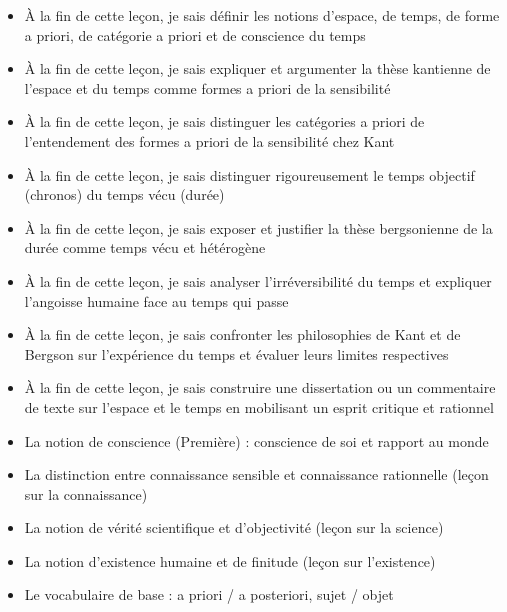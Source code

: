 \documentclass[11pt]{article}
\begin{document}
\begin{objectifs}
\begin{itemize}
\item À la fin de cette leçon, je sais définir les notions d'espace, de temps, de forme a priori, de catégorie a priori et de conscience du temps
\item À la fin de cette leçon, je sais expliquer et argumenter la thèse kantienne de l'espace et du temps comme formes a priori de la sensibilité
\item À la fin de cette leçon, je sais distinguer les catégories a priori de l'entendement des formes a priori de la sensibilité chez Kant
\item À la fin de cette leçon, je sais distinguer rigoureusement le temps objectif (chronos) du temps vécu (durée)
\item À la fin de cette leçon, je sais exposer et justifier la thèse bergsonienne de la durée comme temps vécu et hétérogène
\item À la fin de cette leçon, je sais analyser l'irréversibilité du temps et expliquer l'angoisse humaine face au temps qui passe
\item À la fin de cette leçon, je sais confronter les philosophies de Kant et de Bergson sur l'expérience du temps et évaluer leurs limites respectives
\item À la fin de cette leçon, je sais construire une dissertation ou un commentaire de texte sur l'espace et le temps en mobilisant un esprit critique et rationnel
\end{itemize}
\end{objectifs}

\begin{prerequis}
\begin{itemize}
\item La notion de conscience (Première) : conscience de soi et rapport au monde
\item La distinction entre connaissance sensible et connaissance rationnelle (leçon sur la connaissance)
\item La notion de vérité scientifique et d'objectivité (leçon sur la science)
\item La notion d'existence humaine et de finitude (leçon sur l'existence)
\item Le vocabulaire de base : a priori / a posteriori, sujet / objet
\end{itemize}
\end{prerequis}

\newpage
\end{document}
